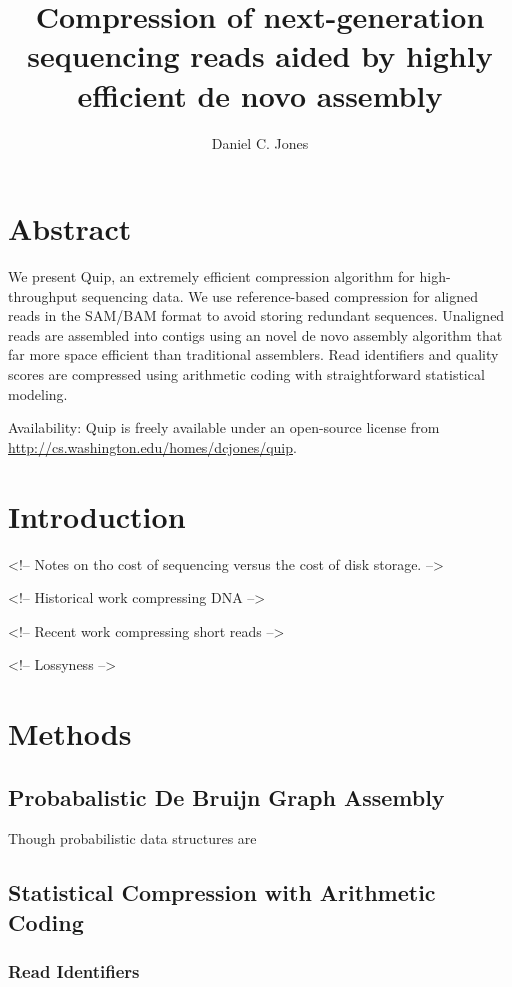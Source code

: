 \documentclass[twocolumn]{article}
\title{Compression of next-generation sequencing reads aided by highly efficient de novo assembly}
\author{Daniel C. Jones}
\begin{document}
\maketitle

\section{Abstract}

We present Quip, an extremely efficient compression algorithm for
high-throughput sequencing data.  We use reference-based compression for aligned
reads in the SAM/BAM format to avoid storing redundant sequences.  Unaligned
reads are assembled into contigs using an novel de novo assembly algorithm that
far more space efficient than traditional assemblers.  Read identifiers and
quality scores are compressed using arithmetic coding with straightforward
statistical modeling.

Availability: Quip is freely available under an open-source license from
\url{http://cs.washington.edu/homes/dcjones/quip}.


\section{Introduction}

<!-- Notes on tho cost of sequencing versus the cost of disk storage. -->

<!-- Historical work compressing DNA -->

<!-- Recent work compressing short reads -->

<!-- Lossyness -->


\section{Methods}

\subsection{Probabalistic De Bruijn Graph Assembly}


Though probabilistic data structures are 


\subsection{Statistical Compression with Arithmetic Coding}

\subsubsection{Read Identifiers}
\end{document}
